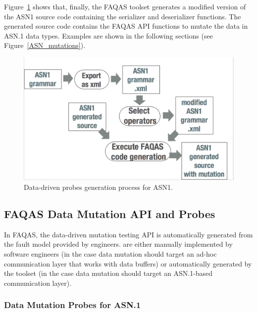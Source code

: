 

Figure~\ref{fig:ASN1ProbesGeneration} shows that, finally, the FAQAS toolset generates a modified version of the ASN1 source code containing the serializer and deserializer functions. The generated source code contains the FAQAS API functions to mutate the data in ASN.1 data types. Examples are shown in the following sections (see Figure~\ref{ASN_mutations}).

\begin{figure}[h]
  \centering
    \includegraphics[width=12cm]{images/ASN1mutationProces}
      \caption{Data-driven probes generation process for ASN1.}
      \label{fig:ASN1ProbesGeneration}
\end{figure}








\clearpage
\subsection{FAQAS Data Mutation API and Probes}
\label{sec:FAQASDataMutationProbes}

In FAQAS, the data-driven mutation testing API is automatically generated from the fault model provided by engineers.  are either manually implemented by software engineers (in the case data mutation should target an ad-hoc communication layer that works with data buffers) or automatically generated by the toolset (in the case data mutation should target an ASN.1-based communication layer).



\subsubsection{Data Mutation Probes for ASN.1}
\label{sec:FAQASDataMutationProbesASN}

